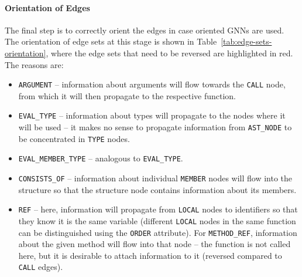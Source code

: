 \paragraph{Orientation of Edges}
The final step is to correctly orient the edges in case oriented GNNs are used. The orientation of edge sets at this stage is shown in Table~\ref{tab:edge-sets-orientation}, where the edge sets that need to be reversed are highlighted in red. The reasons are:
\begin{itemize}
    \item \texttt{ARGUMENT} -- information about arguments will flow towards the \texttt{CALL} node, from which it will then propagate to the respective function.
    \item \texttt{EVAL\_TYPE} -- information about types will propagate to the nodes where it will be used -- it makes no sense to propagate information from \texttt{AST\_NODE} to be concentrated in \texttt{TYPE} nodes.
    \item \texttt{EVAL\_MEMBER\_TYPE} -- analogous to \texttt{EVAL\_TYPE}.
    \item \texttt{CONSISTS\_OF} -- information about individual \texttt{MEMBER} nodes will flow into the structure so that the structure node contains information about its members.
    \item \texttt{REF} -- here, information will propagate from \texttt{LOCAL} nodes to identifiers so that they know it is the same variable (different \texttt{LOCAL} nodes in the same function can be distinguished using the \texttt{ORDER} attribute). For \texttt{METHOD\_REF}, information about the given method will flow into that node -- the function is not called here, but it is desirable to attach information to it (reversed compared to \texttt{CALL} edges).
\end{itemize}

